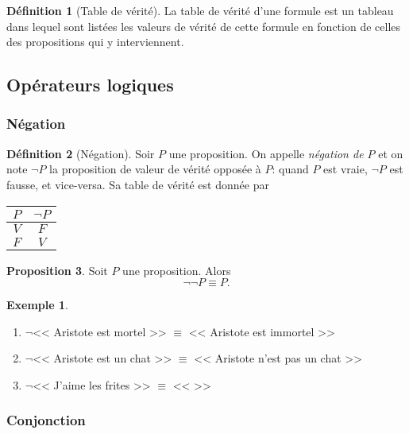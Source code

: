 \documentclass[11pt]{article}
\theoremstyle{definition}
\newtheorem{defn}{Définition}[section]
\newtheorem{prop}[defn]{Proposition}
\newtheorem{exe}{Exemple}
\theoremstyle{remark}
\begin{document}
\begin{defn}[Table de vérité]
La table de vérité d'une formule est un tableau dans lequel sont listées les valeurs de vérité de cette formule en fonction de celles des propositions qui y interviennent.
\end{defn}






\subsection{Opérateurs logiques}

\subsubsection{Négation}

\begin{defn}[Négation]
Soir $P$ une proposition. On appelle \textit{négation de $P$} et on note $\neg P$ la proposition de valeur de vérité opposée à $P$: quand $P$ est vraie, $\neg P$ est fausse, et vice-versa. Sa table de vérité est donnée par
\begin{center}
  \begin{tabular}{|c|c|}\hline
  $P$ & $\neg P$ \\ \hline
  $V$ & $F$ \\ \hline
  $F$ & $V$ \\ \hline
  \end{tabular}
\end{center}
\end{defn}

\begin{prop}
Soit $P$ une proposition. Alors
\[\neg\neg P \equiv P.
\]
\end{prop}

\begin{exe}\leavevmode\begin{enumerate}
\item $\neg$<< Aristote est mortel >> $\equiv$ << Aristote est immortel >>
\item $\neg$<< Aristote est un chat >> $\equiv$ << Aristote n'est pas un chat >>
\item $\neg$<< J'aime les frites >> $\equiv$ << \hspace{7cm} >>
\end{enumerate}

\end{exe}


\subsubsection{Conjonction}
\end{document}
